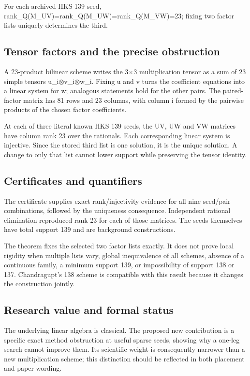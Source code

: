 \documentclass[11pt,a4paper]{article}
\begin{document}
For each archived HKS 139 seed, rank\_Q(M\_UV)=rank\_Q(M\_UW)=rank\_Q(M\_VW)=23; fixing two factor lists uniquely determines the third.

\subsection{Tensor factors and the precise obstruction}
A 23-product bilinear scheme writes the 3\ensuremath{\times}3 multiplication tensor as a sum of 23 simple tensors u\_i\ensuremath{\otimes}v\_i\ensuremath{\otimes}w\_i. Fixing u and v turns the coefficient equations into a linear system for w; analogous statements hold for the other pairs. The paired-factor matrix has 81 rows and 23 columns, with column i formed by the pairwise products of the chosen factor coefficients.

At each of three literal known HKS 139 seeds, the UV, UW and VW matrices have column rank 23 over the rationals. Each corresponding linear system is injective. Since the stored third list is one solution, it is the unique solution. A change to only that list cannot lower support while preserving the tensor identity.

\subsection{Certificates and quantifiers}
The certificate supplies exact rank/injectivity evidence for all nine seed/pair combinations, followed by the uniqueness consequence. Independent rational elimination reproduced rank 23 for each of those matrices. The seeds themselves have total support 139 and are background constructions.

The theorem fixes the selected two factor lists exactly. It does not prove local rigidity when multiple lists vary, global inequivalence of all schemes, absence of a continuous family, a minimum support 139, or impossibility of support 138 or 137. Chandragupt's 138 scheme is compatible with this result because it changes the construction jointly.

\subsection{Research value and formal status}
The underlying linear algebra is classical. The proposed new contribution is a specific exact method obstruction at useful sparse seeds, showing why a one-leg search cannot improve them. Its scientific weight is consequently narrower than a new multiplication scheme; this distinction should be reflected in both placement and paper wording.
\end{document}
